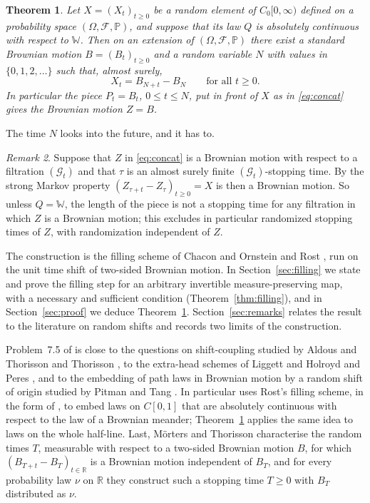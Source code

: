 \documentclass[11pt]{amsart}
\newtheorem{theorem}{Theorem}[section]
\theoremstyle{remark}
\newtheorem{remark}[theorem]{Remark}
\numberwithin{equation}{section}
\newcommand{\Pp}{\mathbb P}
\newcommand{\R}{\mathbb R}
\newcommand{\Wi}{\mathbb W}
\begin{document}
\begin{theorem}\label{thm:main}
Let $X=(X_t)_{t\ge0}$ be a random element of $C_0[0,\infty)$ defined on a probability space $(\Omega,\mathcal F,\Pp)$, and suppose that its law $Q$ is absolutely continuous with respect to $\Wi$. Then on an extension of $(\Omega,\mathcal F,\Pp)$ there exist a standard Brownian motion $B=(B_t)_{t\ge0}$ and a random variable $N$ with values in $\{0,1,2,\dots\}$ such that, almost surely,
\[
X_t=B_{N+t}-B_N\qquad\text{for all }t\ge0 .
\]
In particular the piece $P_t=B_t$, $0\le t\le N$, put in front of $X$ as in \eqref{eq:concat} gives the Brownian motion $Z=B$.
\end{theorem}

The time $N$ looks into the future, and it has to.

\begin{remark}\label{rem:stopping}
Suppose that $Z$ in \eqref{eq:concat} is a Brownian motion with respect to a filtration $(\mathcal G_t)$ and that $\tau$ is an almost surely finite $(\mathcal G_t)$-stopping time. By the strong Markov property $(Z_{\tau+t}-Z_\tau)_{t\ge0}=X$ is then a Brownian motion. So unless $Q=\Wi$, the length of the piece is not a stopping time for any filtration in which $Z$ is a Brownian motion; this excludes in particular randomized stopping times of $Z$, with randomization independent of $Z$.
\end{remark}

The construction is the filling scheme of Chacon and Ornstein \cite{CO} and Rost \cite{Rost71a,Rost71b}, run on the unit time shift of two-sided Brownian motion. In Section~\ref{sec:filling} we state and prove the filling step for an arbitrary invertible measure-preserving map, with a necessary and sufficient condition (Theorem~\ref{thm:filling}), and in Section~\ref{sec:proof} we deduce Theorem~\ref{thm:main}. Section~\ref{sec:remarks} relates the result to the literature on random shifts and records two limits of the construction.

Problem~7.5 of \cite{BS} is close to the questions on shift-coupling studied by Aldous and Thorisson \cite{AT} and Thorisson \cite{Th96,ThBook}, to the extra-head schemes of Liggett \cite{Lig} and Holroyd and Peres \cite{HP}, and to the embedding of path laws in Brownian motion by a random shift of origin studied by Pitman and Tang \cite{PT-patterns,PT-slepian}. In particular \cite[Section~3.5]{PT-patterns} uses Rost's filling scheme, in the form of \cite[Chapter~IX, nos.~63--74]{DM}, to embed laws on $C[0,1]$ that are absolutely continuous with respect to the law of a Brownian meander; Theorem~\ref{thm:main} applies the same idea to laws on the whole half-line. Last, M\"orters and Thorisson \cite{LMT} characterise the random times $T$, measurable with respect to a two-sided Brownian motion $B$, for which $(B_{T+t}-B_T)_{t\in\R}$ is a Brownian motion independent of $B_T$, and for every probability law $\nu$ on $\R$ they construct such a stopping time $T\ge0$ with $B_T$ distributed as $\nu$.
\end{document}
